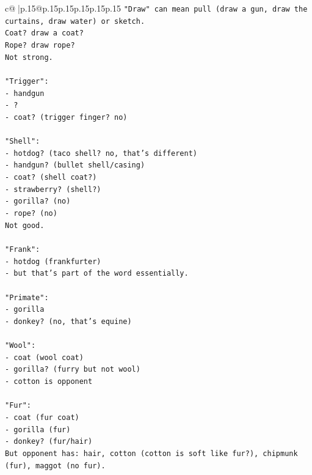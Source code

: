 \documentclass{article}
\begin{document}
{\begin{supertabular}{c@{$\;$}|p{.15\linewidth}@{}p{.15\linewidth}p{.15\linewidth}p{.15\linewidth}p{.15\linewidth}p{.15\linewidth}}
{{{\texttt{"Draw" can mean pull (draw a gun, draw the curtains, draw water) or sketch.} \\
\texttt{Coat? draw a coat?} \\
\texttt{Rope? draw rope?} \\
\texttt{Not strong.} \\
\\ 
\texttt{"Trigger":} \\
\texttt{{-} handgun} \\
\texttt{{-} ?} \\
\texttt{{-} coat? (trigger finger? no)} \\
\\ 
\texttt{"Shell":} \\
\texttt{{-} hotdog? (taco shell? no, that's different)} \\
\texttt{{-} handgun? (bullet shell/casing)} \\
\texttt{{-} coat? (shell coat?)} \\
\texttt{{-} strawberry? (shell?)} \\
\texttt{{-} gorilla? (no)} \\
\texttt{{-} rope? (no)} \\
\texttt{Not good.} \\
\\ 
\texttt{"Frank":} \\
\texttt{{-} hotdog (frankfurter)} \\
\texttt{{-} but that's part of the word essentially.} \\
\\ 
\texttt{"Primate":} \\
\texttt{{-} gorilla} \\
\texttt{{-} donkey? (no, that's equine)} \\
\\ 
\texttt{"Wool":} \\
\texttt{{-} coat (wool coat)} \\
\texttt{{-} gorilla? (furry but not wool)} \\
\texttt{{-} cotton is opponent} \\
\\ 
\texttt{"Fur":} \\
\texttt{{-} coat (fur coat)} \\
\texttt{{-} gorilla (fur)} \\
\texttt{{-} donkey? (fur/hair)} \\
\texttt{But opponent has: hair, cotton (cotton is soft like fur?), chipmunk (fur), maggot (no fur).} \\
}}}
\end{supertabular}}
\end{document}
